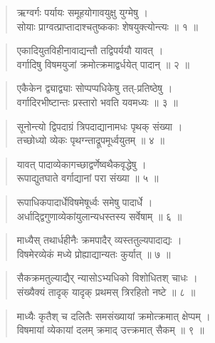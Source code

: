 \documentclass[11pt,a4paper]{article}
\newenvironment{shloka}{\begin{verse}\devanagarifont\large}{\end{verse}}
\begin{document}
\vspace{0.3cm}

\begin{shloka}
ऋग्वर्गः पर्यायः समूहयोगावयुक्षु युग्मेषु ।\\
सोयाः प्राग्वत्प्राप्तादाश्चतुष्ककाः शेषयुक्त्योन्त्यः ॥ १ ॥
\end{shloka}

\begin{shloka}
एकादियुतविहीनावाद्यन्तौ तद्विपर्ययौ यावत् ।\\
वर्गादिषु विषमयुजां क्रमोत्क्रमाद्वर्धयेत् पादान् ॥ २ ॥
\end{shloka}

\begin{shloka}
एकैकेन द्व्याद्व्याः सोप्पप्पधिकेषु तत्-प्रतिष्ठेषु ।\\
वर्गादिरभीष्टान्तः प्रस्तारो भवति यवमध्यः ॥ ३ ॥
\end{shloka}

\begin{shloka}
सूनोन्त्यो द्विपदाग्रं त्रिपदाद्यानामधः पृथक् संख्या ।\\
तच्छोध्यो व्येकः पृथग्न्ताद्रूपमूर्ध्वयुतम् ॥ ४ ॥
\end{shloka}

\begin{shloka}
यावत् पादाव्येकागच्छाद्वर्णेष्वथैकवृद्धेषु ।\\
रूपाद्युतघाते वर्गाद्यानां परा संख्या ॥ ५ ॥
\end{shloka}

\begin{shloka}
रूपाधिकपादार्धेविषमेषूर्ध्वः समेषु पादार्धे ।\\
अर्धाद्द्विगुणाव्येकांयुलान्यधस्तस्य सर्वेषाम् ॥ ६ ॥
\end{shloka}

\begin{shloka}
माध्यैस् तथार्धहीनैः क्रमपादैर् व्यस्ततुल्यपादाद्यः ।\\
विषमेरव्येकं मध्ये प्रोह्याद्यान्यतः कुर्यात् ॥ ७ ॥
\end{shloka}

\begin{shloka}
सैकक्रमतुल्याद्यैर् न्यासोऽभ्यधिको विशोधितश् चाधः ।\\
संख्यैक्यं तादृक् यादृक् प्रथमस् त्रिरहितो नष्टे ॥ ८ ॥
\end{shloka}

\begin{shloka}
माध्यैः कृतैश् च दलितैः समसंख्यायां क्रमोत्क्रमात् क्षेप्पम् ।\\
विषमायां व्येकायां दलम् क्रमाद् उत्त्क्रमात् सैकम् ॥ ९ ॥
\end{shloka}
\end{document}
